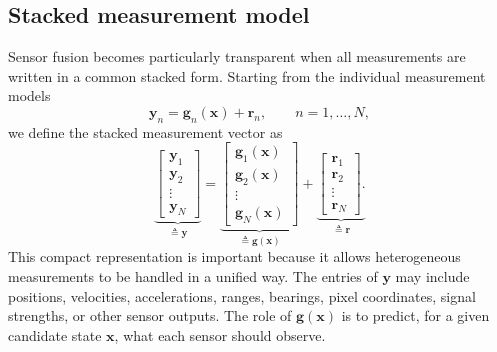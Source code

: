 \documentclass[11pt,oneside,openany]{book}
\begin{document}
\subsection{Stacked measurement model}
Sensor fusion becomes particularly transparent when all measurements are written in a common stacked form. Starting from the individual measurement models
\begin{equation}
\mathbf{y}_n
=
\mathbf{g}_n(\mathbf{x})
+
\mathbf{r}_n,
\qquad n=1,\ldots,N,
\end{equation}
we define the stacked measurement vector as
\begin{equation}
\underbrace{\begin{bmatrix}
\mathbf{y}_1\\
\mathbf{y}_2\\
\vdots\\
\mathbf{y}_N
\end{bmatrix}}_{\triangleq \mathbf{y}} = 
\underbrace{\begin{bmatrix}
\mathbf{g}_1(\mathbf{x})\\
\mathbf{g}_2(\mathbf{x})\\
\vdots\\
\mathbf{g}_N(\mathbf{x})
\end{bmatrix}}_{\triangleq \mathbf{g}(\mathbf{x})} + 
\underbrace{\begin{bmatrix}
\mathbf{r}_1\\
\mathbf{r}_2\\
\vdots\\
\mathbf{r}_N
\end{bmatrix}.}_{\triangleq \mathbf{r}}
\end{equation}
This compact representation is important because it allows heterogeneous measurements to be handled in a unified way. The entries of $\mathbf{y}$ may include positions, velocities, accelerations, ranges, bearings, pixel coordinates, signal strengths, or other sensor outputs. The role of $\mathbf{g}(\mathbf{x})$ is to predict, for a given candidate state $\mathbf{x}$, what each sensor should observe.
\end{document}

